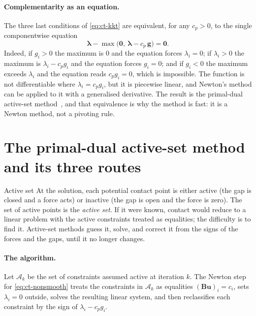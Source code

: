 \paragraph{Complementarity as an equation.}
The three last conditions of \eqref{eq:ct-kkt} are equivalent, for any $c_p>0$, to the single componentwise equation
\begin{equation}\label{eq:ct-nonsmooth}
\bm\lambda-\max\bigl(\bm 0,\ \bm\lambda-c_p\,\bm g\bigr)=\bm 0 .
\end{equation}
Indeed, if $g_i>0$ the maximum is $0$ and the equation forces $\lambda_i=0$; if $\lambda_i>0$ the maximum is $\lambda_i-c_pg_i$ and the equation forces $g_i=0$; and if $g_i<0$ the maximum exceeds $\lambda_i$ and the equation reads $c_pg_i=0$, which is impossible. The function is not differentiable where $\lambda_i=c_pg_i$, but it is piecewise linear, and Newton's method can be applied to it with a generalised derivative. The result is the primal-dual active-set method~\cite{hintermuller2002pdas}, and that equivalence is why the method is fast: it is a Newton method, not a pivoting rule.

\section{The primal-dual active-set method and its three routes}\label{sec:ct-pdas}

\begin{sidenote}{Active set}
At the solution, each potential contact point is either active (the gap is closed and a force acts) or inactive (the gap is open and the force is zero). The set of active points is the \emph{active set}. If it were known, contact would reduce to a linear problem with the active constraints treated as equalities; the difficulty is to find it. Active-set methods guess it, solve, and correct it from the signs of the forces and the gaps, until it no longer changes.
\end{sidenote}

\paragraph{The algorithm.}
Let $\mathcal A_k$ be the set of constraints assumed active at iteration $k$. The Newton step for \eqref{eq:ct-nonsmooth} treats the constraints in $\mathcal A_k$ as equalities $(\bm B\bm u)_i=c_i$, sets $\lambda_i=0$ outside, solves the resulting linear system, and then reclassifies each constraint by the sign of $\lambda_i-c_pg_i$.

